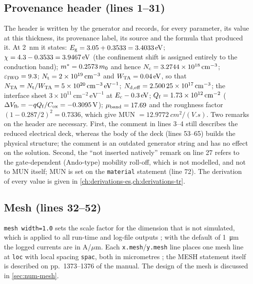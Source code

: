 \subsection{Provenance header (lines 1--31)}

The header is written by the generator and records, for every parameter, its value at this thickness, its provenance
label, its source and the formula that produced it. At \SI{2}{nm} it states: $E_{\mathrm{g}} = 3.05 + 0.3533 = \SI{3.4033}{eV}$;
$\chi = 4.3 - 0.3533 = \SI{3.9467}{eV}$ (the confinement shift is assigned entirely to the conduction band);
$m^{*} = 0.2573\,m_0$ and hence $N_{\mathrm{c}} = \SI{3.2744e18}{cm^{-3}}$; $\varepsilon_{\mathrm{IWO}} = 9.3$; $N_{\mathrm{t}} = \SI{2e19}{cm^{-3}}$ and
$W_{\mathrm{TA}} = \SI{0.04}{eV}$, so that $N_{\mathrm{TA}} = N_{\mathrm{t}}/W_{\mathrm{TA}} = \SI{5e20}{cm^{-3}.eV^{-1}}$; $N_{\mathrm{d,eff}} = \SI{2.50025e17}{cm^{-3}}$;
the interface sheet $3\times10^{11}\,\mathrm{cm^{-2}\,eV^{-1}}$ at $E_{\mathrm{c}} - \SI{0.3}{eV}$; $Q_{\mathrm{f}} = 1.73\times10^{12}\,\mathrm{cm}^{-2}$
($\Delta V_{\mathrm{fb}} = -qQ_{\mathrm{f}}/C_{\mathrm{ox}} = \SI{-0.3095}{V}$); $\mu_{\mathrm{band}} = 17.69$ and the roughness factor
$(1-0.287/2)^2 = 0.7336$, which give MUN $= \SI{12.9772}{cm^2/(V.s)}$. Two remarks on the header are necessary. First,
the comment in lines 3--4 still describes the reduced electrical deck, whereas the body of the deck (lines 53--65) builds
the physical structure; the comment is an outdated generator string and has no effect on the solution. Second, the ``not
inserted natively'' remark on line 27 refers to the gate-dependent (Ando-type) mobility roll-off, which is not modelled,
and not to MUN itself; MUN is set on the \texttt{material} statement (line 72). The derivation of every value is given
in \cref{ch:derivations-es,ch:derivations-tr}.

\subsection{Mesh (lines 32--52)}

\texttt{mesh width=1.0} sets the scale factor for the dimension that is not simulated, which is applied to all run-time
and log-file outputs \citep[p.~1376]{AtlasManual}; with the default of \SI{1}{\micro\metre} \citep[p.~1374]{AtlasManual}
the logged currents are in A/$\mu$m. Each \texttt{x.mesh}/\texttt{y.mesh} line places one mesh line at \texttt{loc}
with local spacing \texttt{spac}, both in micrometres \citep[pp.~633, 1117]{AtlasManual}; the MESH statement itself is
described on pp.~1373--1376 of the manual. The design of the mesh is discussed in \cref{sec:num-mesh}.

